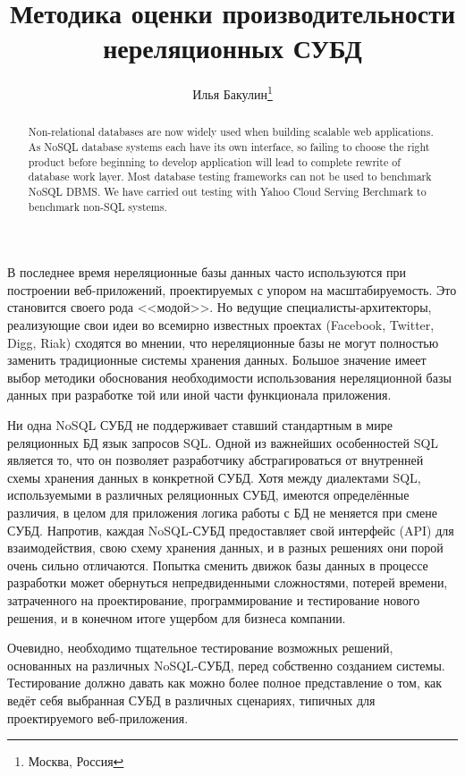 \documentclass[10pt, a5paper]{article}
\begin{document}
\title{Методика оценки производительности нереляционных СУБД}
\author{Илья Бакулин\footnote{Москва, Россия}}
\date{}
\maketitle

\begin{abstract}
Non-relational databases are now widely used when building scalable web
applications. As NoSQL database systems each have its
own interface, so failing to choose the right product before beginning to
develop application will lead to complete rewrite of database work
layer. Most database testing frameworks can not be used to benchmark NoSQL 
DBMS. We have carried out testing with Yahoo Cloud Serving Berchmark to benchmark 
non-SQL systems.
\end{abstract}

В последнее время нереляционные базы данных часто используются при
построении веб-приложений, проектируемых с упором на масштабируемость.
Это становится своего рода <<модой>>. Но ведущие специалисты-архитекторы,
реализующие свои идеи во всемирно известных проектах (Facebook, Twitter,
Digg, Riak) сходятся во мнении, что нереляционные базы не могут
полностью заменить традиционные системы хранения данных. Большое
значение имеет выбор методики обоснования необходимости использования
нереляционной базы данных при разработке той или иной части функционала
приложения.

Ни одна NoSQL СУБД не поддерживает ставший стандартным в мире
реляционных БД язык запросов SQL. Одной из важнейших особенностей SQL
является то, что он позволяет разработчику абстрагироваться от
внутренней схемы хранения данных в конкретной СУБД. Хотя между
диалектами SQL, используемыми в различных реляционных СУБД, имеются
определённые различия, в целом для приложения логика работы с БД не
меняется при смене СУБД. Напротив, каждая NoSQL-СУБД предоставляет свой
интерфейс (API) для взаимодействия, свою схему хранения данных, и в
разных решениях они порой очень сильно отличаются. Попытка сменить
движок базы данных в процессе разработки может обернуться
непредвиденными сложностями, потерей времени, затраченного на
проектирование, программирование и тестирование нового решения, и в
конечном итоге ущербом для бизнеса компании.

Очевидно, необходимо тщательное тестирование возможных решений,
основанных на различных NoSQL-СУБД, перед собственно созданием системы.
Тестирование должно давать как можно более полное представление о том,
как ведёт себя выбранная СУБД в различных сценариях, типичных для
проектируемого веб-приложения.
\end{document}
